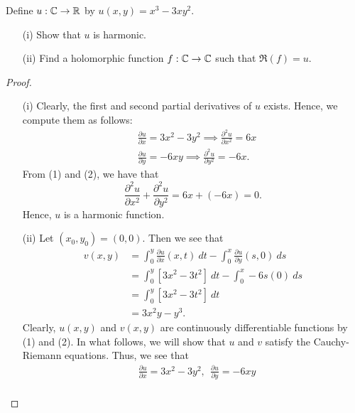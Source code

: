 \documentclass[a4paper]{article}
\begin{document}
\begin{problem}
   Define \( u: \mathbb{C} \to \mathbb{R}  \) by \( u(x,y) = x^{3} - 3x y^{2} \). 
   \begin{enumerate}
       \item[(i)] Show that \( u  \) is harmonic.
        \item[(ii)] Find a holomorphic function \( f: \mathbb{C} \to \mathbb{C}  \) such that \( \Re(f) = u  \).
   \end{enumerate}
\end{problem}

\begin{proof}
\begin{enumerate}
    \item[(i)] Clearly, the first and second partial derivatives of \( u  \) exists. Hence, we compute them as follows:
        \begin{align*}
            &\frac{\partial u }{\partial x }  = 3 x^{2} - 3y^{2} \implies \frac{\partial ^{2} u  }{\partial x^{2} }  = 6x \tag{1} \\
                                                                &\frac{\partial u }{\partial y } = - 6xy \implies \frac{\partial^{2} u  }{\partial y^{2} } = - 6 x. \tag{2} 
        \end{align*}
        From (1) and (2), we have that 
        \[  \frac{\partial^{2} u  }{\partial x^{2} } + \frac{\partial ^{2} u }{\partial y^{2} }  = 6x + (-6x) = 0. \]
        Hence, \( u  \) is a harmonic function.
    \item[(ii)] Let \( ({x}_{0}, {y}_{0}) = (0,0) \). Then we see that 
        \begin{align*}
            v(x,y) &= \int_{ 0 }^{ y }  \frac{\partial u }{\partial x } (x,t) \ dt - \int_{ 0 }^{ x }  \frac{\partial u }{\partial y }  (s,0) \ ds \\
                   &= \int_{ 0 }^{ y } [3 x^{2} - 3 t^{2}] \ dt - \int_{ 0 }^{ x } -6s(0) \ ds \\
                   &= \int_{ 0 }^{ y } [3 x^{2} - 3 t^{2}] \ dt \\
                   &= 3 x^{2} y - y^{3}.
        \end{align*}
        Clearly, \( u(x,y) \) and \( v(x,y) \) are continuously differentiable functions by (1) and (2). In what follows, we will show that \( u  \) and \( v  \) satisfy the Cauchy-Riemann equations. Thus, we see that
        \!\begin{align*}
            &\frac{\partial u }{\partial x }  = 3x^{2} - 3y^{2},  \ \   \frac{\partial u }{\partial y }  = -6xy \\

\end{align*}
\end{enumerate}
\end{proof}
\end{document}
